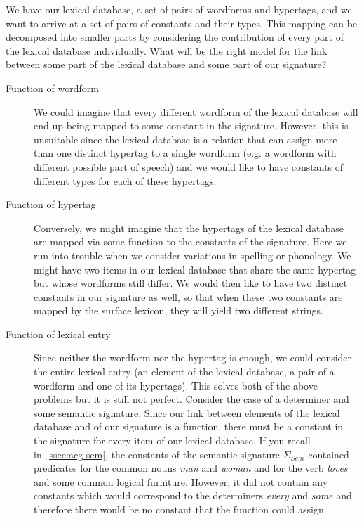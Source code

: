 We have our lexical database, a set of pairs of wordforms and hypertags,
and we want to arrive at a set of pairs of constants and their
types. This mapping can be decomposed into smaller parts by considering
the contribution of every part of the lexical database
individually. What will be the right model for the link between some
part of the lexical database and some part of our signature?

\begin{description}
  \item[Function of wordform] We could imagine that every different
    wordform of the lexical database will end up being mapped to some
    constant in the signature. However, this is unsuitable since the
    lexical database is a relation that can assign more than one
    distinct hypertag to a single wordform (e.g. a wordform with
    different possible part of speech) and we would like to have
    constants of different types for each of these hypertags.
  \item[Function of hypertag] Conversely, we might imagine that the
    hypertags of the lexical database are mapped via some function to
    the constants of the signature. Here we run into trouble when we
    consider variations in spelling or phonology. We might have two
    items in our lexical database that share the same hypertag but whose
    wordforms still differ. We would then like to have two distinct
    constants in our signature as well, so that when these two constants
    are mapped by the surface lexicon, they will yield two different
    strings.
  \item[Function of lexical entry] Since neither the wordform nor the
    hypertag is enough, we could consider the entire lexical entry (an
    element of the lexical database, a pair of a wordform and one of its
    hypertags). This solves both of the above problems but it is still
    not perfect. Consider the case of a determiner and some semantic
    signature. Since our link between elements of the lexical database
    and of our signature is a function, there must be a constant in the
    signature for every item of our lexical database. If you recall
    in~\ref{ssec:acg-sem}, the constants of the semantic signature
    $\Sigma_{Sem}$ contained predicates for the common nouns \emph{man}
    and \emph{woman} and for the verb \emph{loves} and some common
    logical furniture. However, it did not contain any constants which
    would correspond to the determiners \emph{every} and \emph{some} and
    therefore there would be no constant that the function could assign

\end{description}
